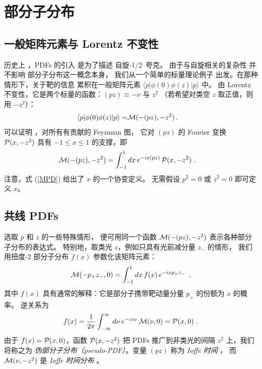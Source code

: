 \section{部分子分布}

\subsection{一般矩阵元素与 Lorentz 不变性}

历史上 \cite{Feynman:1973xc}，PDFs 的引入
是为了描述 \mbox{自旋-1/2 夸克。}
由于与自旋相关的复杂性
并不影响
部分子分布这一概念本身，
我们从一个简单的标量理论例子
出发。在那种情形下，关于靶的信息
累积在一般矩阵元素 $\langle p | \phi (0) \phi(z) | p \rangle $ 中。
由 Lorentz 不变性，它是两个标量的函数：$(pz) \equiv - \nu$ 与 $z^2$
（若希望对类空 $z$ 取正值，则用 $-z^2$）：
\begin{align}
\langle p |   \phi(0) \phi (z)|p \rangle
=  & {\cal M} (-(pz), -z^2)
\, .
\label{lorentz}
\end{align}
可以证明 \cite{Radyushkin:2016hsy,Radyushkin:1983wh}，对所有有贡献的 Feynman 图，
它对 $(pz)$ 的 Fourier 变换 ${\cal P} (x, -z^2)$
具有 $-1 \leq x \leq 1$ 的支撑，即
\begin{align}
{\cal M} (-(pz), -z^2)
&   =
\int_{-1}^1 dx
\, e^{-i x (pz) } \,  {\cal P} (x, -z^2)  \   .
\label{MPD}
\end{align}
注意，式 (\ref{MPD}) 给出了 $x$ 的一个协变定义。
无需假设
$p^2=0$ 或 $z^2=0$ 即可定义 $x$。

\subsection{共线 PDFs}

选取 $p$ 和 $z$ 的一些特殊情形，
便可用同一个函数 ${\cal M} (-(pz), -z^2)$
表示各种部分子分布的表达式。
特别地，取类光 $z$，例如只具有光前减分量 $z_-$ 的情形，
我们用扭度-2 部分子分布 $f(x)$ 参数化该矩阵元素：
\begin{align}
{\cal M} (-p_+ z_- , 0)  =
\int_{-1}^1 dx \, f(x) \,
e^{-ixp_+ z_-} \,  \   ,
\label{twist2par0}
\end{align}
其中 $f(x)$ 具有通常的解释：它是部分子携带靶动量分量 $p_+$ 的份额为 $x$
的概率。
逆关系为
\begin{align}
f  (x)  =\frac{1}{2 \pi}  \int_{-\infty}^{\infty}  d\nu \, e^{-i x \nu}  \, {\cal M}(\nu , 0)    = {\cal P} (x, 0)
\  .
\label{fxMnu}
\end{align}
由于 $f(x) =   {\cal P} (x, 0) $，函数 $ {\cal P} (x, -z^2) $
把 PDFs 推广到非类光的间隔 $z^2$ 上，我们将称之为
{\it 伪部分子分布（pseudo-PDF）}。变量 $(pz)$ 称为
{\it Ioffe 时间} \cite{Ioffe:1969kf}，
而 ${\cal M}(\nu , -z^2) $ 是 {\it Ioffe 时间分布} \cite{Braun:1994jq}。

